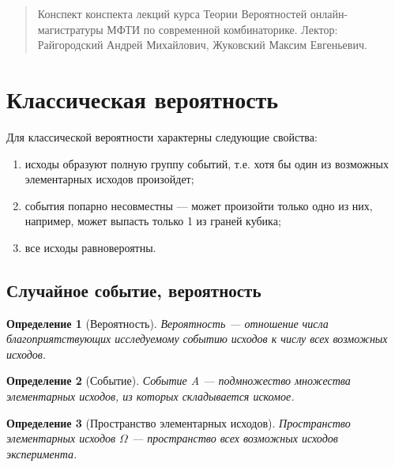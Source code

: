\documentclass{article}
\theoremstyle{mydef}
\newtheorem{definition}{Определение}
\begin{document}
\begin{abstract}
    Конспект конспекта лекций курса Теории Вероятностей онлайн-магистратуры МФТИ по современной комбинаторике. \newline
    Лектор: Райгородский Андрей Михайлович, Жуковский Максим Евгеньевич.
\end{abstract}

\tableofcontents
 
\newpage

\section{Классическая вероятность}

Для классической вероятности характерны следующие свойства:
\begin{enumerate}
    \item исходы образуют полную группу событий, т.е. хотя бы один из возможных элементарных исходов произойдет;
    \item события попарно несовместны --- может произойти только одно из них, например, может выпасть только 1 из граней кубика;
    \item все исходы равновероятны.
\end{enumerate}

\subsection{Случайное событие, вероятность}

\begin{definition}[Вероятность]
    Вероятность --- отношение числа благоприятствующих исследуемому событию исходов к числу всех возможных исходов.
\end{definition}

\begin{definition}[Событие]
    Событие A --- подмножество множества элементарных исходов, из которых складывается искомое.
\end{definition}

\begin{definition}[Пространство элементарных исходов]
    Пространство элементарных исходов $\Omega$ --- пространство всех возможных исходов эксперимента.
\end{definition}
\end{document}
